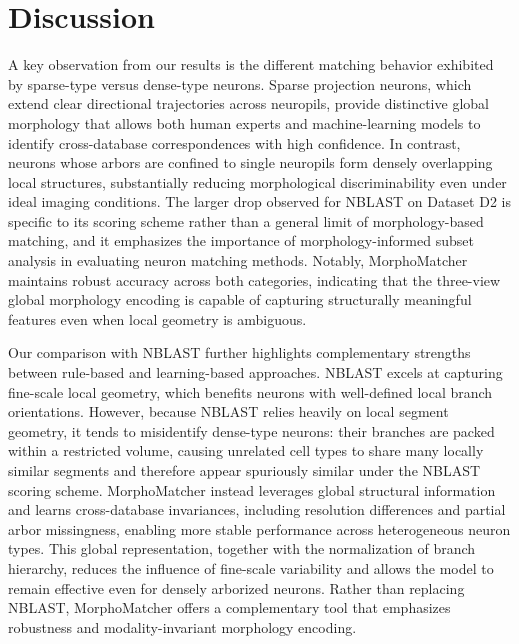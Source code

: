 \documentclass[10pt,a4paper]{article}
\begin{document}
\section{Discussion}

A key observation from our results is the different matching behavior exhibited
by sparse-type versus dense-type neurons. Sparse projection neurons, which
extend clear directional trajectories across neuropils, provide distinctive
global morphology that allows both human experts and machine-learning models to
identify cross-database correspondences with high confidence. In contrast,
neurons whose arbors are confined to single neuropils form densely overlapping
local structures, substantially reducing morphological discriminability even
under ideal imaging conditions.
The larger drop observed for NBLAST on Dataset D2 is specific to its scoring
scheme rather than a general limit of morphology-based matching, and it
emphasizes the importance of morphology-informed subset analysis in evaluating
neuron matching methods.
Notably, MorphoMatcher maintains robust accuracy across both categories,
indicating that the three-view global morphology encoding is capable of
capturing structurally meaningful features even when local geometry is
ambiguous.

Our comparison with NBLAST further highlights complementary strengths between
rule-based and learning-based approaches. NBLAST excels at capturing fine-scale
local geometry, which benefits neurons with well-defined local branch
orientations. However, because NBLAST relies heavily on local segment geometry,
it tends to misidentify dense-type neurons: their branches are packed within a
restricted volume, causing unrelated cell types to share many locally similar
segments and therefore appear spuriously similar under the NBLAST scoring
scheme. MorphoMatcher instead leverages global structural information and learns
cross-database invariances, including resolution differences and partial arbor
missingness, enabling more stable performance across heterogeneous neuron types.
This global representation, together with the normalization of branch hierarchy,
reduces the influence of fine-scale variability and allows the model to remain
effective even for densely arborized neurons. Rather than replacing NBLAST,
MorphoMatcher offers a complementary tool that emphasizes robustness and
modality-invariant morphology encoding.
\end{document}
